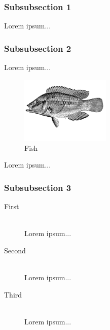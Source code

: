 \documentclass[12pt, spanish]{article}
\begin{document}
\subsubsection{Subsubsection 1} %

Lorem ipsum...


\subsubsection{Subsubsection 2} %

Lorem ipsum...
\begin{figure} %
  \begin{center}
    \includegraphics[width=0.38\textwidth]{fish}
  \end{center}
  \caption{Fish}
\end{figure}
Lorem ipsum...


\subsubsection{Subsubsection 3} %

\begin{description} %

\item[First] \hfill \\
Lorem ipsum...

\item[Second] \hfill \\
Lorem ipsum...

\item[Third] \hfill \\
Lorem ipsum...

\end{description} 

\end{document}
